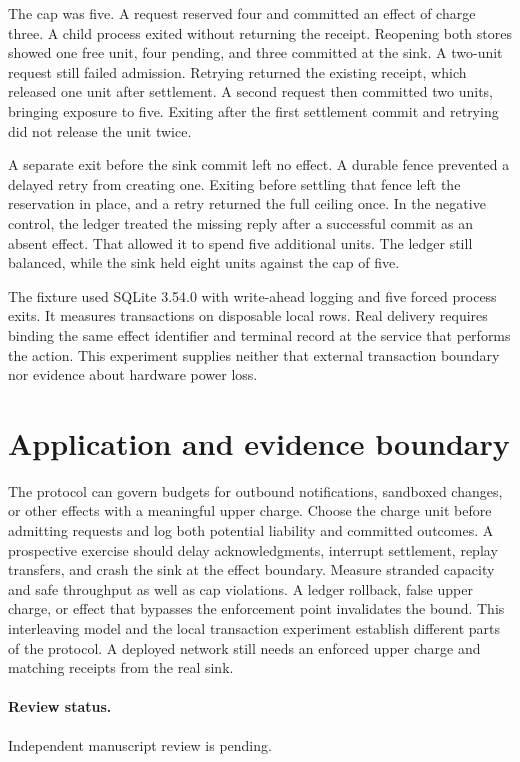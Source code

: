 \documentclass[11pt]{article}
\begin{document}
The cap was five. A request reserved four and committed an effect
of charge three. A child process exited without returning the
receipt. Reopening both stores showed one free unit, four pending,
and three committed at the sink. A two-unit request still failed
admission. Retrying returned the existing receipt, which released
one unit after settlement. A second request then committed two
units, bringing exposure to five. Exiting after the first
settlement commit and retrying did not release the unit twice.

A separate exit before the sink commit left no effect. A durable
fence prevented a delayed retry from creating one. Exiting before
settling that fence left the reservation in place, and a retry
returned the full ceiling once. In the negative control, the
ledger treated the missing reply after a successful commit as
an absent effect. That allowed it to spend five additional units.
The ledger still balanced, while the sink held eight units
against the cap of five.

The fixture used SQLite 3.54.0 with write-ahead logging and five
forced process exits. It measures transactions on disposable local
rows. Real delivery requires binding the same effect identifier
and terminal record at the service that performs the action.
This experiment supplies neither that external transaction boundary
nor evidence about hardware power loss.

\section{Application and evidence boundary}
The protocol can govern budgets for outbound notifications,
sandboxed changes, or other effects with a meaningful upper
charge. Choose the charge unit before admitting requests and
log both potential liability and committed outcomes. A prospective
exercise should delay acknowledgments, interrupt settlement,
replay transfers, and crash the sink at the effect boundary.
Measure stranded capacity and safe throughput as well as cap
violations. A ledger rollback, false upper charge, or effect that
bypasses the enforcement point invalidates the bound. This
interleaving model and the local transaction experiment establish
different parts of the protocol. A deployed network still needs an
enforced upper charge and matching receipts from the real sink.

\paragraph{Review status.} Independent manuscript review is pending.
\end{document}
